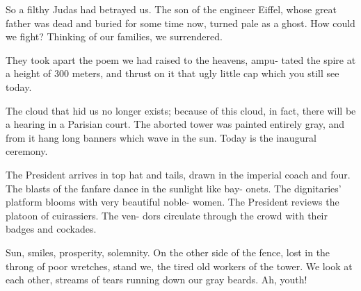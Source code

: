 \documentclass[12pt]{article}
\begin{document}
So a filthy Judas had betrayed us. The son of the engineer Eiffel,
whose great father was dead and buried for some time now, turned
pale as a ghost. How could we fight? Thinking of our families, we
surrendered.

They took apart the poem we had raised to the heavens, ampu-
tated the spire at a height of 300 meters, and thrust on it that ugly little
cap which you still see today.

The cloud that hid us no longer exists; because of this cloud, in
fact, there will be a hearing in a Parisian court. The aborted tower was
painted entirely gray, and from it hang long banners which wave in
the sun. Today is the inaugural ceremony.

The President arrives in top hat and tails, drawn in the imperial
coach and four. The blasts of the fanfare dance in the sunlight like bay-
onets. The dignitaries’ platform blooms with very beautiful noble-
women. The President reviews the platoon of cuirassiers. The ven-
dors circulate through the crowd with their badges and cockades.

Sun, smiles, prosperity, solemnity. On the other side of the fence, lost
in the throng of poor wretches, stand we, the tired old workers of the
tower. We look at each other, streams of tears running down our gray
beards. Ah, youth!
\end{document}
